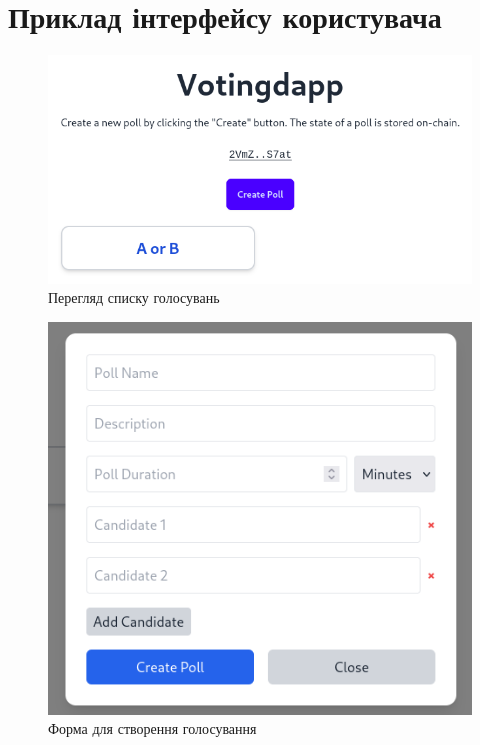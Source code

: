 \documentclass[14pt]{extreport}
\begin{document}
  \chapter{Приклад інтерфейсу користувача}
  \label{app:UI}
  
  \begin{figure}[H]
    \centering
    \includegraphics[scale=0.5]{UIPolls}
    \caption{Перегляд списку голосувань}
  \end{figure}
  
  \begin{figure}[H]
    \centering
    \includegraphics[scale=0.5]{UICreate}
    \caption{Форма для створення голосування}
  \end{figure}
  
\end{document}
